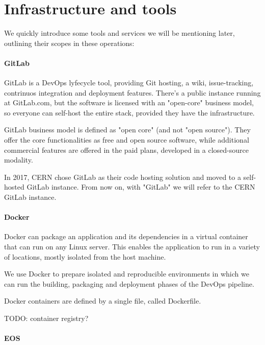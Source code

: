 \begin{enumerate}
\end{enumerate}

\section{Infrastructure and tools}

We quickly introduce some tools and services we will be mentioning later, outlining their scopes in these operations:

\paragraph{GitLab}

GitLab is a DevOps lyfecycle tool, providing Git hosting, a wiki, issue-tracking, contrinuos integration and deployment features. There's a public instance running at GitLab.com, but the software is licensed with an "open-core" business model, so everyone can self-host the entire stack, provided they have the infrastructure.

GitLab business model is defined as "open core" (and not "open source"). They offer the core functionalities as free and open source software, while additional commercial features are offered in the paid plans, developed in a closed-source modality.

In 2017, CERN chose GitLab as their code hosting solution and moved to a self-hosted GitLab instance. From now on, with "GitLab" we will refer to the CERN GitLab instance.

\paragraph{Docker}

Docker can package an application and its dependencies in a virtual container that can run on any Linux server. This enables the application to run in a variety of locations, mostly isolated from the host machine.

We use Docker to prepare isolated and reproducible environments in which we can run the building, packaging and deployment phases of the DevOps pipeline.

Docker containers are defined by a single file, called Dockerfile.

TODO: container registry?

\paragraph{EOS}

